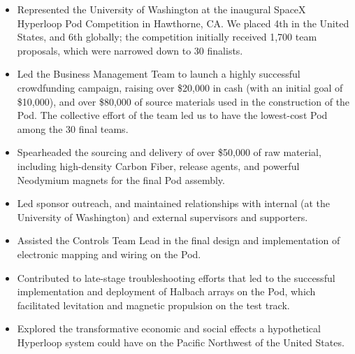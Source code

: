 \documentclass[10pt, letterpaper]{letter}
\begin{document}
        \begin{itemize}[noitemsep, topsep=0pt, parsep=0pt, partopsep=0pt]
            
                \item 
    Represented the University of Washington at the inaugural SpaceX Hyperloop Pod Competition in Hawthorne, CA. We placed 4th in the United States, and 6th globally; the competition initially received 1,700 team proposals, which were narrowed down to 30 finalists.
            
                \item 
    Led the Business Management Team to launch a highly successful crowdfunding campaign, raising over \$20,000 in cash (with an initial goal of \$10,000), and over \$80,000 of source materials used in the construction of the Pod. The collective effort of the team led us to have the lowest-cost Pod among the 30 final teams.
            
                \item 
    Spearheaded the sourcing and delivery of over \$50,000 of raw material, including high-density Carbon Fiber, release agents, and powerful Neodymium magnets for the final Pod assembly.
            
                \item 
    Led sponsor outreach, and maintained relationships with internal (at the University of Washington) and external supervisors and supporters.
            
                \item 
    Assisted the Controls Team Lead in the final design and implementation of electronic mapping and wiring on the Pod.
            
                \item 
    Contributed to late-stage troubleshooting efforts that led to the successful implementation and deployment of Halbach arrays on the Pod, which facilitated levitation and magnetic propulsion on the test track.
            
                \item 
    Explored the transformative economic and social effects a hypothetical Hyperloop system could have on the Pacific Northwest of the United States.
            
        \end{itemize}
    

\end{document}
